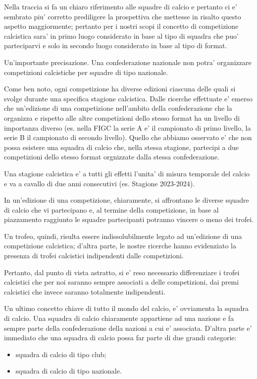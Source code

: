 Nella traccia si fa un chiaro riferimento alle squadre di calcio e pertanto ci e' sembrato
piu' corretto prediligere la prospettiva che mettesse in risalto questo aspetto maggiormente;
pertanto per i nostri scopi il concetto di competizione calcistica sara' in primo luogo
considerato in base al tipo di squadra che puo' parteciparvi e solo in secondo luogo
considerato in base al tipo di format.

Un'importante precisazione. Una confederazione nazionale non potra' organizzare competizioni
calcistiche per squadre di tipo nazionale.

\bigskip
\bigskip

Come ben noto, ogni competizione ha diverse edizioni ciascuna delle quali si svolge durante
una specifica stagione calcistica.
Dalle ricerche effettuate e' emerso che un'edizione di una competizione nell'ambito della
confederazione che la organizza e rispetto alle altre competizioni dello stesso format
ha un livello di importanza diverso (es. nella FIGC la serie A e' il campionato di primo
livello, la serie B il campionato di secondo livello).
Quello che abbiamo osservato e' che non possa esistere una squadra di calcio che, nella
stessa stagione, partecipi a due competizioni dello stesso format orgnizzate dalla stessa
confederazione.

Una stagione calcistica e' a tutti gli effetti l'unita' di misura temporale del calcio
e va a cavallo di due anni consecutivi (es. Stagione 2023-2024).

In un'edizione di una competizione, chiaramente, si affrontano le diverse squadre di calcio
che vi partecipano e, al termine della competizione, in base al piazzamento raggiunto le
squadre partecipanti potranno vincere o meno dei trofei.

Un trofeo, quindi, risulta essere indissolubilmente legato ad un'edizione di una competizione
calcistica; d'altra parte, le nostre ricerche hanno evidenziato la presenza di trofei calcistici
indipendenti dalle competizioni.

Pertanto, dal punto di vista astratto, si e' reso necessario differenziare i trofei calcistici
che per noi saranno sempre associati a delle competizioni, dai premi calcistici che invece
saranno totalmente indipendenti.

Un ultimo concetto chiave di tutto il mondo del calcio, e' ovviamenta la squadra di calcio.
Una squadra di calcio chiaramente appartiene ad una nazione e fa sempre parte della
confederazione della nazioni a cui e' associata.
D'altra parte e' immediato che una squadra di calcio possa far parte di due grandi categorie:
\begin{itemize}
	\item squadra di calcio di tipo club;
	\item squadra di calcio di tipo nazionale.
\end{itemize}

